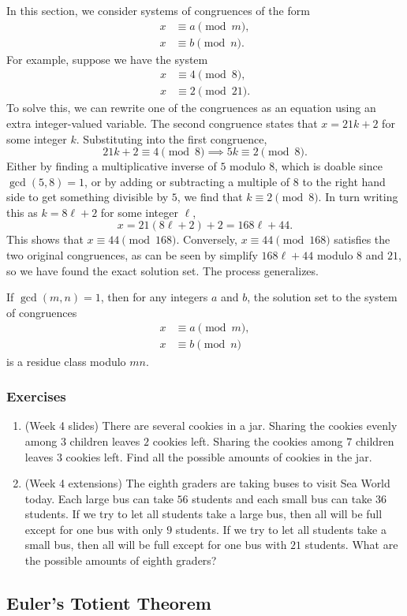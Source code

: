 In this section, we consider systems of congruences of the form
\begin{align*}
x &\equiv a\pmod{m}, \\
x &\equiv b\pmod{n}.
\end{align*}
For example, suppose we have the system
\begin{align*}
x &\equiv 4\pmod{8}, \\
x &\equiv 2\pmod{21}.
\end{align*}
To solve this, we can rewrite one of the congruences as an equation using an extra integer-valued variable. The second congruence states that $x = 21k + 2$ for some integer $k$. Substituting into the first congruence,
\begin{equation*}
21k + 2\equiv 4\pmod{8}\implies 5k\equiv 2\pmod{8}.
\end{equation*}
Either by finding a multiplicative inverse of $5$ modulo $8$, which is doable since $\gcd(5,8) = 1$, or by adding or subtracting a multiple of $8$ to the right hand side to get something divisible by $5$, we find that $k\equiv 2\pmod{8}$. In turn writing this as $k = 8\ell + 2$ for some integer $\ell$,
\begin{equation*}
x = 21(8\ell + 2) + 2 = 168\ell + 44.
\end{equation*}
This shows that $\boxed{x\equiv 44\pmod{168}}$. Conversely, $x\equiv 44\pmod{168}$ satisfies the two original congruences, as can be seen by simplify $168\ell + 44$ modulo $8$ and $21$, so we have found the exact solution set. The process generalizes.

\begin{theorem}\label{thm:crt}
If $\gcd(m,n) = 1$, then for any integers $a$ and $b$, the solution set to the system of congruences
\begin{align*}
x &\equiv a\pmod{m}, \\
x &\equiv b\pmod{n}
\end{align*}
is a residue class modulo $mn$.
\end{theorem}

\subsubsection*{Exercises}

\begin{enumerate}
\item (Week 4 slides) There are several cookies in a jar. Sharing the cookies evenly among $3$ children leaves $2$ cookies left. Sharing the cookies among $7$ children leaves $3$ cookies left. Find all the possible amounts of cookies in the jar.
\item (Week 4 extensions) The eighth graders are taking buses to visit Sea World today. Each large bus can take $56$ students and each small bus can take $36$ students. If we try to let all students take a large bus, then all will be full except for one bus with only $9$ students. If we try to let all students take a small bus, then all will be full except for one bus with $21$ students. What are the possible amounts of eighth graders?
\end{enumerate}


\subsection{Euler's Totient Theorem}